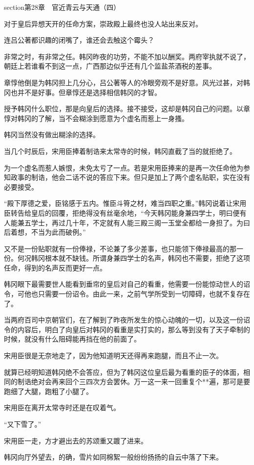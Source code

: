 section{第28章　官近青云与天通（四）}

对于皇后异想天开的任命方案，崇政殿上最终也没人站出来反对。

连吕公著都识趣的闭嘴了，谁还会去触这个霉头？

非常之时，有非常之任。韩冈昨夜的功劳，不能不加以酬奖。两府宰执就不说了，朝廷上若谁看不到这一点，广西那边似乎还有几个监盐茶酒税的差事。

章惇他倒是为韩冈担上几分心，吕公著等人的冷眼旁观不是好意。风光过甚，对韩冈也并不是好事。但章惇还是选择相信韩冈的才智。

授予韩冈什么职位，那是向皇后的选择。接不接受，这却是韩冈自己的问题。以章惇对韩冈的了解，当不会糊涂到愿意为个虚名而惹上一身搔。

韩冈当然没有做出糊涂的选择。

当几个时辰后，宋用臣捧着制诰来太常寺的时候，韩冈直截了当的就拒绝了。

为一个虚名而惹人嫉恨，未免太亏了一点。若是宋用臣捧来的是再一次任命他为参知政事的制诰，他会二话不说的答应下来。但只是加上了两个虚名贴职，实在没有必要接受。

“殿下厚德之爱，臣铭感于五内。惟臣斗筲之材，难当四职之重。”韩冈说着让宋用臣转告给皇后的回覆，拒绝得没有丝毫余地，“今天韩冈能身兼四学士，明曰便有人能兼五学士，再过几十年，不定就有人能三殿三阁一玉堂全都给一身担了。为曰后着想，不当为此而破例。”

又不是一份贴职就有一份俸禄，不论兼了多少差事，也只能领下俸禄最高的那一份。何况韩冈根本就不缺钱。所谓身兼四学士的名声，韩冈也不需要，拒绝了这项任命，得到的名声反而更好一点。

韩冈眼下最需要世人能看到垂帘的皇后对自己的看重，他需要一份能惊动世人的诏令，可他也只需要一份诏令。由此一来，之前气学所受到一切障碍，也就不复存在了。

当两府百司中京朝官们，在了解到了昨夜所发生的惊心动魄的一切，以及这一份诏令的内容后，明白了向皇后对韩冈的看重是实打实的，那么等到没有了天子牵制的时候，就没有什么阻碍能再挡在他的前面了。

宋用臣很是无奈地走了，因为他知道明天还得再来跑腿，而且不止一次。

就算已经明知道韩冈绝不会答应，但为了韩冈这位皇后最为看重的臣子的体面，相同的制诰绝对会再来回个三四次方会罢休。万一这一来一回重复个**遍，那可是要跑细了大腿，跑粗了小腿了。

宋用臣在离开太常寺时还是在叹着气。

“又下雪了。”

宋用臣一走，方才避出去的苏颂重又踱了进来。

韩冈向厅外望去，的确，雪片如同棉絮一般纷纷扬扬的自云中落了下来。

